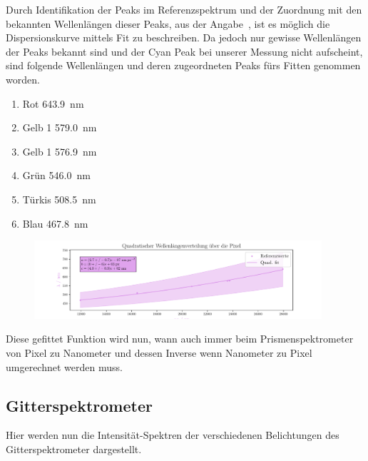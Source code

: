 \documentclass[12pt,english,ngerman]{scrartcl}
\begin{document}
Durch Identifikation der Peaks im Referenzspektrum und der Zuordnung mit den
bekannten Wellenlängen dieser Peaks, aus der Angabe~\cite{}, ist es möglich die
Dispersionskurve mittels Fit zu beschreiben. Da jedoch nur gewisse Wellenlängen
der Peaks bekannt sind und der Cyan Peak bei unserer Messung nicht aufscheint,
sind folgende Wellenlängen und deren zugeordneten Peaks fürs Fitten genommen
worden.

\begin{enumerate}
	\item Rot \SI{643.9}{\nano\meter}
	\item Gelb 1 \SI{579.0}{\nano\meter}
	\item Gelb 1 \SI{576.9}{\nano\meter}
	\item Grün \SI{546.0}{\nano\meter}
	\item Türkis \SI{508.5}{\nano\meter}
	\item Blau \SI{467.8}{\nano\meter}
\end{enumerate}

\begin{figure}[H]
	\begin{center}
		\includegraphics[width=0.95\textwidth]{figures/mappingPxToWaveLength.pdf}
	\end{center}
	\caption{}\label{fig:dispersionkurve}
\end{figure}

Diese gefittet Funktion wird nun, wann auch immer beim Prismenspektrometer von
Pixel zu Nanometer und dessen Inverse wenn Nanometer zu Pixel umgerechnet
werden muss.

\subsection{Gitterspektrometer}

Hier werden nun die Intensität-Spektren der verschiedenen Belichtungen des
Gitterspektrometer dargestellt.
\end{document}
